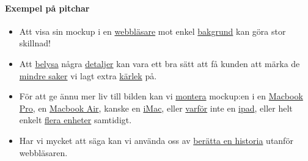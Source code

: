\documentclass{article}
\begin{document}
      \paragraph{Exempel på pitchar}
      \begin{itemize}
        \item
          Att visa sin mockup i en
          \href{http://netdna.webdesignerdepot.com/uploads/2013/07/browsermockup.jpg}{webbläsare}
          mot enkel
          \href{http://www.pixeden.com/media/k2/galleries/196/002-google-chrome-browser-navigator-web-psd.jpg}{bakgrund}
          kan göra stor skillnad!
        \item
          Att
          \href{http://freebiesbug.com/wp-content/uploads/2013/03/free-psd-safari-browser.jpg}{belysa}
          några
          \href{http://dribbble.com/shots/308945-Texture-Detailing?list=searches&tag=website_details}{detaljer}
          kan vara ett bra sätt att få kunden att märka de
          \href{http://dribbble.com/shots/659616-Project-Planner-details?list=searches&tag=website_details}{mindre saker}
          vi lagt extra
          \href{http://dribbble.com/shots/311028-Donate?list=searches&tag=website_details}{kärlek}
          på.
        \item
          För att ge ännu mer liv till bilden kan vi
          \href{http://multimediabomb.com/preview/thumbs/hands-on-macbook-laptop-mockups-psd.jpg}{montera}
          mockup:en i en
          \href{http://dribbble.com/shots/1226683-Portfolio-Redesign-2k13?list=tags&tag=website}{Macbook Pro},
          en
          \href{http://dribbble.com/shots/1226951-Minimal-Browser-Version?list=popular&offset=70}{Macbook Air},
          kanske en
          \href{http://kravencastle.com/wp-content/uploads/2012/09/iMac_mari01.jpg}{iMac},
          eller
          \href{http://dribbble.com/shots/1227262-Website-Portfolio?list=tags&tag=website}{varför}
          inte en
          \href{http://dribbble.com/shots/1224075-Central-Reach?list=tags&tag=website}{ipad},
          eller helt enkelt
          \href{http://www.psdexplorer.com/wp-content/uploads/2012/09/free-psd-responsive_screen_mockup_pack.png}{flera enheter}
          samtidigt.
        \item
          Har vi mycket att säga kan vi använda oss av
          \href{http://f.cl.ly/items/0c2v1D1x0S463X0O151u/marketing-presentation-minimal-landing.png}{berätta en historia}
          utanför webbläsaren.
      \end{itemize}
\end{document}
